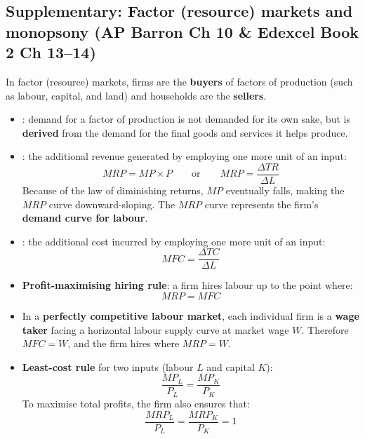 \subsection{Supplementary: Factor (resource) markets and monopsony (AP Barron Ch 10 \& Edexcel Book 2 Ch 13--14)}
In factor (resource) markets, firms are the \textbf{buyers} of factors of production (such as labour, capital, and land) and households are the \textbf{sellers}.
\begin{itemize}
  \item {}: demand for a factor of production is not demanded for its own sake, but is \textbf{derived} from the demand for the final goods and services it helps produce.
  \item {}: the additional revenue generated by employing one more unit of an input:
  \[MRP = MP \times P \qquad \text{or} \qquad MRP = \dfrac{\Delta TR}{\Delta L}\]
  Because of the law of diminishing returns, $MP$ eventually falls, making the $MRP$ curve downward-sloping. The $MRP$ curve represents the firm's \textbf{demand curve for labour}.
  \item {}: the additional cost incurred by employing one more unit of an input:
  \[MFC = \dfrac{\Delta TC}{\Delta L}\]
  \item \textbf{Profit-maximising hiring rule}: a firm hires labour up to the point where:
  \[MRP = MFC\]
  \item In a \textbf{perfectly competitive labour market}, each individual firm is a \textbf{wage taker} facing a horizontal labour supply curve at market wage $W$. Therefore $MFC = W$, and the firm hires where $MRP = W$.
  \item \textbf{Least-cost rule} for two inputs (labour $L$ and capital $K$):
  \[\dfrac{MP_L}{P_L} = \dfrac{MP_K}{P_K}\]
  To maximise total profits, the firm also ensures that:
  \[\dfrac{MRP_L}{P_L} = \dfrac{MRP_K}{P_K} = 1\]
\end{itemize}

